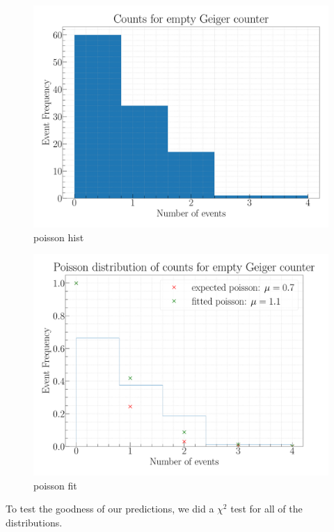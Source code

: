 \begin{figure}[H]
\centering
\includegraphics[width=\textwidth]{../Figures/Geiger_poisson_histogram.pdf}
\caption{poisson hist}
\label{fig:PoissonHist}
\end{figure}

\begin{figure}[H]
\centering
\includegraphics[width=\textwidth]{../Figures/Geiger_poisson_fit.pdf}
\caption{poisson fit}
\label{fig:PoissonFit}
\end{figure}

To test the goodness of our predictions, we did a $\chi^2$ test for all of the distributions.   

